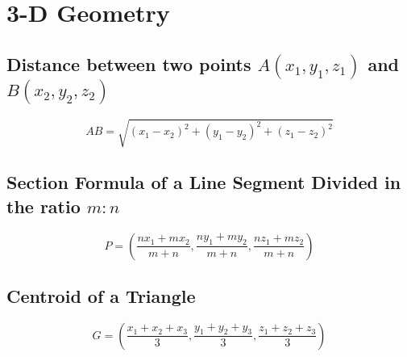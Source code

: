 \chapter{3-D Geometry}
\section{Distance between two points $A(x_1,y_1,z_1)$ and $B(x_2,y_2,z_2)$}
\begin{equation}
	AB=\sqrt{(x_1-x_2)^2+(y_1-y_2)^2+(z_1-z_2)^2}
\end{equation}


\section{Section Formula of a Line Segment Divided in the ratio $m:n$}
\begin{equation}
	P=\left(\dfrac{nx_1+mx_2}{m+n},\dfrac{ny_1+my_2}{m+n},\dfrac{nz_1+mz_2}{m+n}\right)
\end{equation}


\section{Centroid of a Triangle}
\begin{equation}
	G=\left(\dfrac{x_1+x_2+x_3}{3},\dfrac{y_1+y_2+y_3}{3},\dfrac{z_1+z_2+z_3}{3}\right)
\end{equation}
